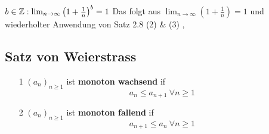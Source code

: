 \Bsp[2.9] \( b \in \mathbb{Z}: \lim_{n \rightarrow \infty } \left( 1 + \frac{1}{n}\right)^b = 1\) \newline
Das folgt aus \( \lim_{n \rightarrow \infty } \left( 1 + \frac{1}{n}\right) = 1 \) und wiederholter Anwendung von Satz 2.8 (2) \& (3)
\sep
\subsection{Satz von Weierstrass}
\Def[2.10]
\begin{enumerate}
    \item [1] \((a_n)_{n \geq 1}\) ist \textbf{monoton wachsend} if
    \[a_n \leq a_{n+1} \ \forall n \geq 1\]
    \item [2] \((a_n)_{n \geq 1}\) ist \textbf{monoton fallend} if 
    \[a_{n+1} \leq a_n \ \forall n \geq 1\]
    \newline
    \newline
\end{enumerate}

